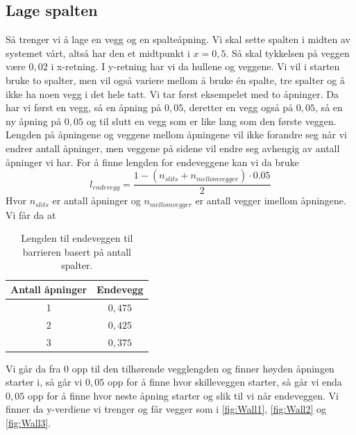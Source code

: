 \documentclass[reprint,english,notitlepage]{revtex4-2}  %
\begin{document}
\subsection{Lage spalten} \label{ssec:Spalte}
Så trenger vi å lage en vegg og en spalteåpning. Vi skal sette spalten i midten av systemet vårt, altså har den et midtpunkt i $x=0,5$. Så skal tykkelsen på veggen være $0,02$ i x-retning. I y-retning har vi da hullene og veggene. Vi vil i starten bruke to spalter, men vil også variere mellom å bruke én spalte, tre spalter og å ikke ha noen vegg i det hele tatt. Vi tar først eksempelet med to åpninger. Da har vi først en vegg, så en åpning på $0,05$, deretter en vegg også på $0,05$, så en ny åpning på $0,05$ og til slutt en vegg som er like lang som den første veggen. Lengden på åpningene og veggene mellom åpningene vil ikke forandre seg når vi endrer antall åpninger, men veggene på sidene vil endre seg avhengig av antall åpninger vi har. For å finne lengden for endeveggene kan vi da bruke
$$
l_{endevegg}=\frac{1-(n_{slits}+n_{mellomvegger})\cdot 0.05}{2}
$$
Hvor $n_{slits}$ er antall åpninger og $n_{mellomvegger}$ er antall vegger imellom åpningene.\newline
Vi får da at
\begin{table}[H]
\centering 
	\begin{tabular}{|c|c|}
		\hline
		Antall åpninger & Endevegg \\
		\hline 
		1 & $0,475$ \\
		\hline
		2& $0,425$ \\ \hline 
		3& $0,375$ \\ \hline
		
	\end{tabular}
	\caption{Lengden til endeveggen til barrieren basert på antall spalter.}
\end{table}
Vi går da fra 0 opp til den tilhørende vegglengden og finner høyden åpningen starter i, så går vi $0,05$ opp for å finne hvor skilleveggen starter, så går vi enda $0,05$ opp for å finne hvor neste åpning starter og slik til vi når endeveggen. Vi finner da y-verdiene vi trenger og får vegger som i \autoref{fig:Wall1}, \autoref{fig:Wall2} og \autoref{fig:Wall3}.
\end{document}
